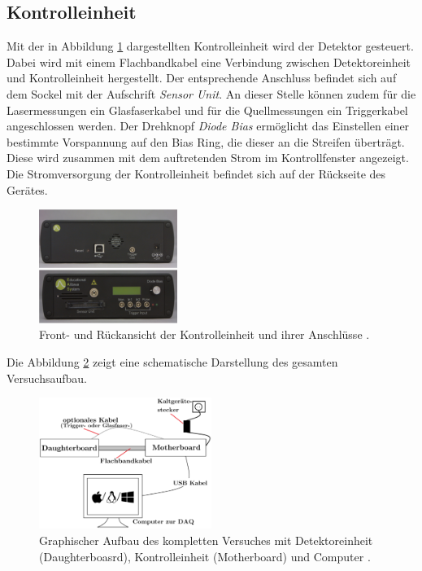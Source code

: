 \subsection{Kontrolleinheit}
Mit der in Abbildung \ref{fig:control} dargestellten Kontrolleinheit wird der Detektor gesteuert. Dabei wird mit einem Flachbandkabel eine Verbindung zwischen Detektoreinheit und Kontrolleinheit
hergestellt. Der entsprechende Anschluss befindet sich auf dem Sockel mit der Aufschrift \textit{Sensor Unit}. An dieser Stelle können zudem für die Lasermessungen ein Glasfaserkabel und für die Quellmessungen ein Triggerkabel angeschlossen werden. Der Drehknopf \textit{Diode Bias} ermöglicht das Einstellen einer bestimmte Vorspannung auf den Bias Ring, die dieser an die Streifen überträgt. Diese wird zusammen mit dem auftretenden Strom im Kontrollfenster angezeigt. Die Stromversorgung der Kontrolleinheit befindet sich auf der Rückseite des Gerätes.
\begin{figure}[htb]
  \centering
  \includegraphics[width=0.4\textwidth]{graphics/Control.png}
  \caption{Front- und Rückansicht der Kontrolleinheit und ihrer Anschlüsse \cite{anleitung}.}
  \label{fig:control}
\end{figure}
Die Abbildung \ref{fig:aufbau} zeigt eine schematische Darstellung des gesamten Versuchsaufbau.
\begin{figure}[htb]
  \centering
  \includegraphics[width=0.5\textwidth]{graphics/Aufbau.png}
  \caption{Graphischer Aufbau des kompletten Versuches mit Detektoreinheit
  (Daughterboasrd), Kontrolleinheit (Motherboard) und Computer \cite{anleitung}.}
  \label{fig:aufbau}
\end{figure}
